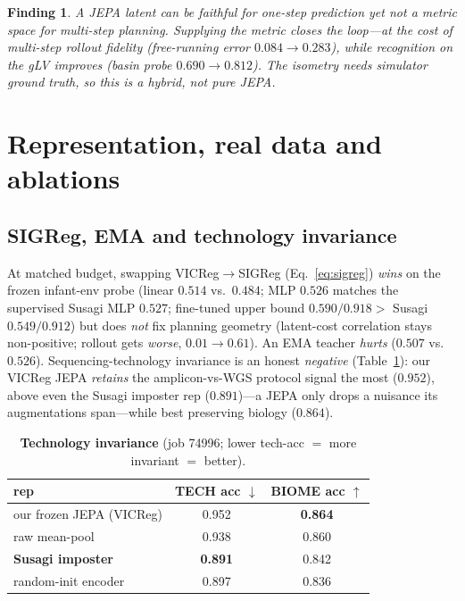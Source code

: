 \documentclass[10pt,twocolumn]{article}
\newtheorem{finding}{Finding}
\begin{document}
\begin{finding}
A JEPA latent can be \emph{faithful} for one-step prediction yet \emph{not a metric space} for
multi-step planning. Supplying the metric closes the loop---at the cost of multi-step rollout fidelity
(free-running error $0.084\!\to\!0.283$), while recognition on the gLV \emph{improves}
(basin probe $0.690\!\to\!0.812$). The isometry needs simulator ground truth, so this is a \emph{hybrid},
not pure JEPA.
\end{finding}

\section{Representation, real data and ablations}
\label{sec:rep}

\subsection{SIGReg, EMA and technology invariance}
At matched budget, swapping VICReg$\to$SIGReg (Eq.~\ref{eq:sigreg}) \emph{wins} on the frozen infant-env
probe (linear $0.514$ vs.\ $0.484$; MLP $0.526$ matches the supervised Susagi MLP $0.527$; fine-tuned
upper bound $0.590/0.918 >$ Susagi $0.549/0.912$) but does \emph{not} fix planning geometry (latent-cost
correlation stays non-positive; rollout gets \emph{worse}, $0.01\!\to\!0.61$). An EMA teacher
\emph{hurts} ($0.507$ vs.\ $0.526$). Sequencing-technology invariance is an honest \emph{negative}
(Table~\ref{tab:tech}): our VICReg JEPA \emph{retains} the amplicon-vs-WGS protocol signal the most
($0.952$), above even the Susagi imposter rep ($0.891$)---a JEPA only drops a nuisance its augmentations
span---while best preserving biology ($0.864$).

\begin{table}[t]
\centering\small
\caption{\textbf{Technology invariance} (job 74996; lower tech-acc $=$ more invariant $=$ better).}
\label{tab:tech}
\begin{tabular}{@{}lcc@{}}
\toprule
rep & TECH acc $\downarrow$ & BIOME acc $\uparrow$ \\
\midrule
our frozen JEPA (VICReg) & 0.952 & \textbf{0.864} \\
raw mean-pool            & 0.938 & 0.860 \\
\textbf{Susagi imposter} & \textbf{0.891} & 0.842 \\
random-init encoder      & 0.897 & 0.836 \\
\bottomrule
\end{tabular}
\end{table}
\end{document}
